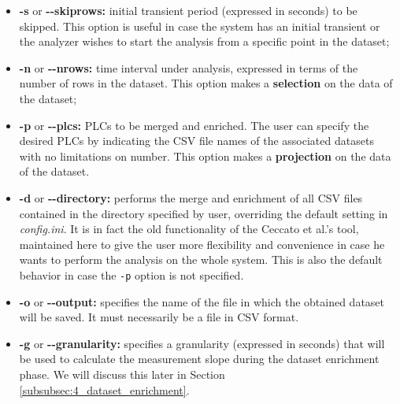 \begin{itemize}
	\item \textbf{-s} or \textbf{{-}{-}skiprows:} initial transient period (expressed in seconds) to be skipped. This option is useful in case the system has an initial transient or the analyzer wishes to start the analysis from a specific point in the dataset;
	
	\item \textbf{-n} or \textbf{{-}{-}nrows:} time interval under analysis, expressed in terms of the number of rows in the dataset.\newline
	This option makes a \textbf{selection} on the data of the dataset;
	
	\item \textbf{-p} or \textbf{{-}{-}plcs:} PLCs to be merged and enriched. The user can specify the desired PLCs by indicating the CSV file names of the associated datasets with no limitations on number.\newline
	This option makes a \textbf{projection} on the data of the dataset.
	
	\item \textbf{-d} or \textbf{{-}{-}directory:} performs the merge and enrichment of all CSV files contained in the directory specified by user, overriding the default setting in \textit{config.ini}. It is in fact the old functionality of the Ceccato et al.'s tool, maintained here to give the user more flexibility and convenience in case he wants to perform the analysis on the whole system. This is also the default behavior in case the \texttt{-p} option is not specified.
	
	\item \textbf{-o} or \textbf{{-}{-}output:} specifies the name of the file in which the obtained dataset will be saved. It must necessarily be a file in CSV format.
	
	\item \textbf{-g} or \textbf{{-}{-}granularity:} specifies a granularity (expressed in seconds) that will be used to calculate the measurement slope during the dataset enrichment phase. We will discuss this later in Section \ref{subsubsec:4_dataset_enrichment}.
\end{itemize}
\vfill

